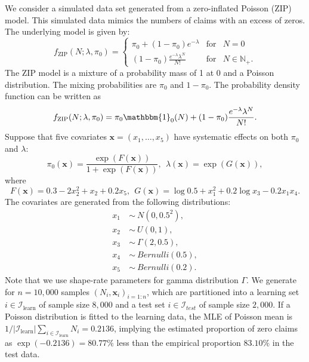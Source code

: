 \documentclass[11pt]{article}
\numberwithin{equation}{section}
\def\N{{\mathbb N}}  %
\def\bx{\boldsymbol{x}}
\begin{document}
We consider a simulated data set generated from a zero-inflated Poisson (ZIP) model. This simulated data mimics the numbers of claims with an excess of zeros.
The underlying  model is given by:
\begin{equation*}
	f_{\text{ZIP}}(N;\lambda,\pi_0) = \left\{ 
	\begin{array}{ccl}
		\pi_0+(1-\pi_0)e^{-\lambda} & \mbox{for}
		& N=0 \\
		(1-\pi_0)\frac{e^{-\lambda}\lambda^N}{N!} & \mbox{for} &N\in\N_+.
	\end{array}\right.
\end{equation*}
The ZIP model is a mixture of a probability mass of 1 at 0 and a Poisson distribution. The mixing probabilities are $\pi_0$ and $1-\pi_0$.
The probability density function can be written as
$$f_\text{ZIP}(N;\lambda,\pi_0)= \pi_0\mathbbm{1}_{0}(N) + 
(1-\pi_0)\frac{e^{-\lambda}\lambda^N}{N!}.$$
Suppose that five covariates $\bx=(x_1,\ldots,x_5)$ have systematic effects on both $\pi_0$ and $\lambda$:
\begin{equation*}
	\pi_0(\bx)=\frac{\exp \left(F(\bx)\right)}{1+\exp\left( F(\bx)\right)}, ~~
	\lambda(\bx)=\exp\left( G(\bx)\right), 
\end{equation*}
where
\begin{equation*}
	F(\bx)=0.3-2x_2^2+x_2+0.2x_5, ~~G(\bx)=\log 0.5+x_1^2 + 0.2\log x_3 - 0.2x_1 x_4.
\end{equation*}
The covariates are generated from the following distributions:
\begin{align*}
	x_1~&\sim~N(0,0.5^2),\\
	x_2~&\sim~U(0,1), \\
	x_3~&\sim~\Gamma(2,0.5), \\
	x_4~&\sim~Bernulli(0.5),\\
	x_5~&\sim~Bernulli(0.2).
\end{align*}
Note that we use shape-rate parameters for gamma distribution $\Gamma$.
We generate for $n=10,000$ samples $(N_i,\bx_i)_{i=1:n}$, which are partitioned into a learning set $i\in\mathcal{I}_\text{learn}$ of sample size $8,000$ and a test set $i\in\mathcal{I}_{test}$ of sample size $2,000$. 
If a Poisson distribution is fitted to the learning data, the MLE of Poisson mean is $1/|\mathcal{I}_\text{learn}|\sum_{i\in\mathcal{I}_\text{learn}}N_i=0.2136$, implying the estimated proportion of zero claims as $\exp(-0.2136)=80.77\%$ less than the empirical proportion $83.10\%$ in the test data. 
\end{document}
